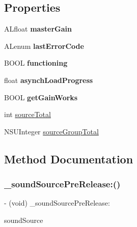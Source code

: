 \subsection*{Properties}
\begin{DoxyCompactItemize}
\item 
\mbox{\label{interfaceCDSoundEngine_a96d6c388b213e392ff18d10dd5b65bcc}} 
A\+Lfloat {\bfseries master\+Gain}
\item 
\mbox{\label{interfaceCDSoundEngine_adcaee276e577e18c0695b3c898dc4b73}} 
A\+Lenum {\bfseries last\+Error\+Code}
\item 
\mbox{\label{interfaceCDSoundEngine_ae41ed791ec668d068862b5a3280f594e}} 
B\+O\+OL {\bfseries functioning}
\item 
\mbox{\label{interfaceCDSoundEngine_a90eef03bd81033435088cfff2606fe39}} 
float {\bfseries asynch\+Load\+Progress}
\item 
\mbox{\label{interfaceCDSoundEngine_ab4b1226112dec878ada892eff9fb0244}} 
B\+O\+OL {\bfseries get\+Gain\+Works}
\item 
int \hyperlink{interfaceCDSoundEngine_a951c8a98f46192e4ed56ebe41f7abe59}{source\+Total}
\item 
N\+S\+U\+Integer \hyperlink{interfaceCDSoundEngine_a2e416630cc0722eac6ba889dcb9461ba}{source\+Group\+Total}
\end{DoxyCompactItemize}


\subsection{Method Documentation}
\mbox{\label{interfaceCDSoundEngine_ad05b4a121e37fe36d3df453989be82af}} 
\subsubsection{\texorpdfstring{\+\_\+sound\+Source\+Pre\+Release\+:()}{\_soundSourcePreRelease:()}\hspace{0.1cm}{\footnotesize\ttfamily [1/4]}}
{\footnotesize\ttfamily -\/ (void) \+\_\+sound\+Source\+Pre\+Release\+: \begin{DoxyParamCaption}\item[{(\hyperlink{interfaceCDSoundSource}{C\+D\+Sound\+Source} $\ast$)}]{sound\+Source }\end{DoxyParamCaption}}

